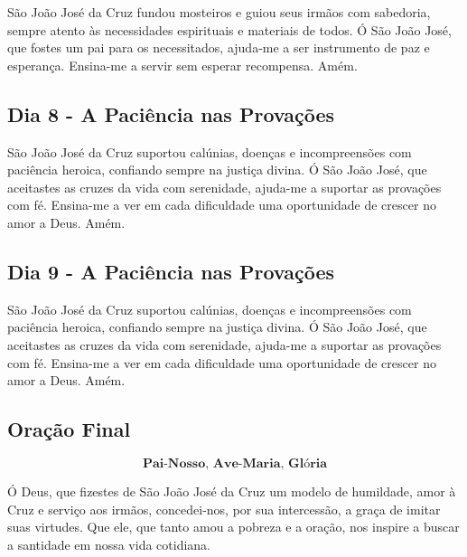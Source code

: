 \documentclass[a4paper,14pt]{extarticle} \usepackage[utf8]{inputenc}
\begin{document}
\underline{}

São João José da Cruz fundou mosteiros e guiou seus irmãos com sabedoria, sempre atento às necessidades espirituais e materiais de todos.
Ó São João José, que fostes um pai para os necessitados, ajuda-me a ser instrumento de paz e esperança. Ensina-me a servir sem esperar recompensa. Amém.


\underline{}


\subsection{Dia 8 - A Paciência nas Provações}


\underline{}

São João José da Cruz suportou calúnias, doenças e incompreensões com paciência heroica, confiando sempre na justiça divina.
Ó São João José, que aceitastes as cruzes da vida com serenidade, ajuda-me a suportar as provações com fé. Ensina-me a ver em cada dificuldade uma oportunidade de crescer no amor a Deus. Amém.


\underline{}


\subsection{Dia 9 - A Paciência nas Provações}

\underline{}

São João José da Cruz suportou calúnias, doenças e incompreensões com paciência heroica, confiando sempre na justiça divina.
Ó São João José, que aceitastes as cruzes da vida com serenidade, ajuda-me a suportar as provações com fé. Ensina-me a ver em cada dificuldade uma oportunidade de crescer no amor a Deus. Amém.

\underline{}


\subsection{Oração Final}\label{sub:final} %

\[\textbf{Pai-Nosso, Ave-Maria, Glória}\]

Ó Deus, que fizestes de São João José da Cruz um modelo de humildade, amor à Cruz e serviço aos irmãos, concedei-nos, por sua intercessão, a graça de imitar suas virtudes. Que ele, que tanto amou a pobreza e a oração, nos inspire a buscar a santidade em nossa vida cotidiana.
\end{document}

